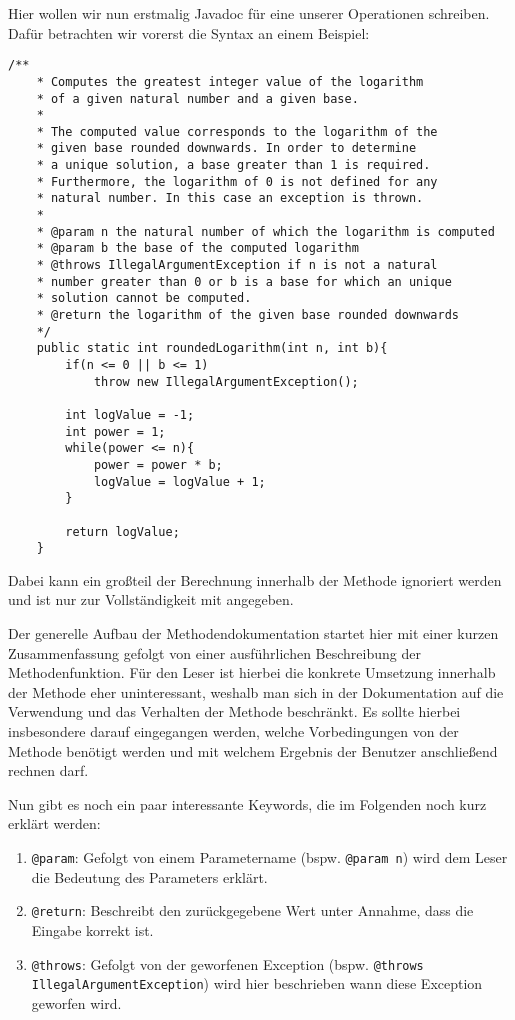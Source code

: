 \begin{Infobox}[Javadoc]
    Hier wollen wir nun erstmalig Javadoc für eine unserer Operationen schreiben. Dafür betrachten wir vorerst die Syntax an einem Beispiel:
    \begin{lstlisting}[numbers=none]
    /**
    * Computes the greatest integer value of the logarithm 
    * of a given natural number and a given base. 
    * 
    * The computed value corresponds to the logarithm of the
    * given base rounded downwards. In order to determine
    * a unique solution, a base greater than 1 is required.
    * Furthermore, the logarithm of 0 is not defined for any 
    * natural number. In this case an exception is thrown.
    * 
    * @param n the natural number of which the logarithm is computed
    * @param b the base of the computed logarithm
    * @throws IllegalArgumentException if n is not a natural
    * number greater than 0 or b is a base for which an unique
    * solution cannot be computed.
    * @return the logarithm of the given base rounded downwards
    */
    public static int roundedLogarithm(int n, int b){
        if(n <= 0 || b <= 1)
            throw new IllegalArgumentException();
        
        int logValue = -1;
        int power = 1;
        while(power <= n){
            power = power * b;
            logValue = logValue + 1;
        }

        return logValue;
    }
    \end{lstlisting}
    Dabei kann ein großteil der Berechnung innerhalb der Methode ignoriert werden und ist nur zur Vollständigkeit mit angegeben. \par
    Der generelle Aufbau der Methodendokumentation startet hier mit einer kurzen Zusammenfassung 
    gefolgt von einer ausführlichen Beschreibung der Methodenfunktion. Für den Leser ist hierbei die 
    konkrete Umsetzung innerhalb der Methode eher uninteressant, weshalb man sich in der Dokumentation
    auf die Verwendung und das Verhalten der Methode beschränkt. Es sollte hierbei insbesondere darauf 
    eingegangen werden, welche Vorbedingungen von der Methode benötigt werden und mit welchem Ergebnis 
    der Benutzer anschließend rechnen darf. \par 
    Nun gibt es noch ein paar interessante Keywords, die im Folgenden noch kurz erklärt werden:
    \begin{enumerate}[label=\roman*)]
        \item \lstinline{@param}: Gefolgt von einem Parametername (bspw. \lstinline{@param n}) wird dem
        Leser die Bedeutung des Parameters erklärt.
        \item \lstinline{@return}: Beschreibt den zurückgegebene Wert unter Annahme, dass die Eingabe korrekt ist.
        \item \lstinline{@throws}: Gefolgt von der geworfenen Exception (bspw. \lstinline{@throws IllegalArgumentException})
        wird hier beschrieben wann diese Exception geworfen wird.
    \end{enumerate}
\end{Infobox}
